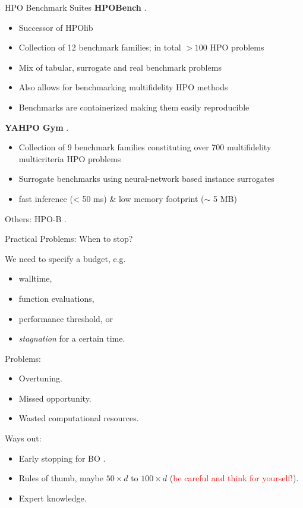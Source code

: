 	\begin{frame}{HPO Benchmark Suites}
		\textbf{HPOBench} .
		\begin{itemize}
			\item Successor of HPOlib
			\item Collection of 12 benchmark families; in total $>100$ HPO problems
			\item Mix of tabular, surrogate and real benchmark problems
			\item Also allows for benchmarking multifidelity HPO methods
			\item Benchmarks are containerized making them easily reproducible
		\end{itemize}
		\vspace{1em}
		\textbf{YAHPO Gym} .
		\begin{itemize}
			\item Collection of 9 benchmark families constituting over 700 multifidelity multicriteria HPO problems
			\item Surrogate benchmarks using neural-network based instance surrogates
			\item fast inference (< 50 ms) \& low memory footprint ($\sim$ 5 MB)
		\end{itemize}
		\vspace{1em}
		Others: HPO-B .
	\end{frame}
	  


	\begin{frame}{Practical Problems: When to stop?}

		We need to specify a budget, e.g.
		\begin{itemize}
			\item walltime,
			\item function evaluations,
			\item performance threshold, or
			\item \textit{stagnation} for a certain time.
		\end{itemize}

		Problems:
		\begin{itemize}
			\item Overtuning. 
			\item Missed opportunity. 
			\item Wasted computational resources.
		\end{itemize}


		Ways out:
		\begin{itemize}
			\item Early stopping for BO .
			\item Rules of thumb, maybe $50 \times d$ to $100 \times d$  (\textcolor{red}{be careful and think for yourself!}).
			\item Expert knowledge.
		\end{itemize}

	\end{frame}

